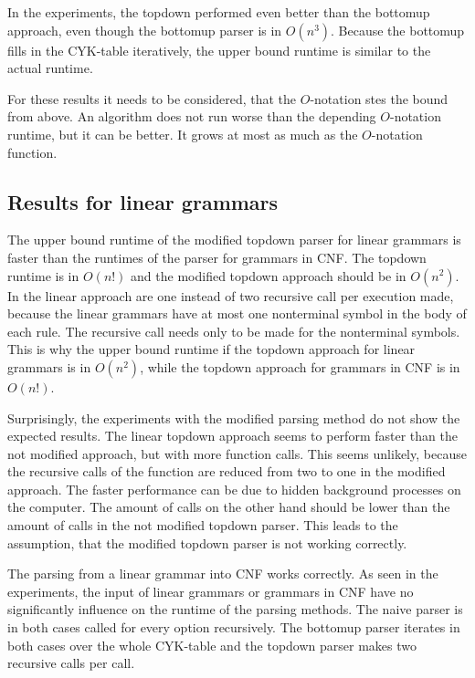 \documentclass[a4paper, 11pt]{article}
\begin{document}
In the experiments, the topdown performed even better than the bottomup approach, even though the bottomup parser is in $O(n^3)$. Because the bottomup fills in the CYK-table iteratively, the upper bound runtime is similar to the actual runtime.

For these results it needs to be considered, that the $O$-notation stes the bound from above. An algorithm does not run worse than the depending $O$-notation runtime, but it can be better. It grows at most as much as the $O$-notation function. \cite{bigO}

\subsection{Results for linear grammars}
\label{results_linear}

The upper bound runtime of the modified topdown parser for linear grammars is faster than the runtimes of the parser for grammars in CNF. The topdown runtime is in $O(n!)$ and the modified topdown approach should be in $O(n^2)$. In the linear approach are one instead of two recursive call per execution made, because the linear grammars have at most one nonterminal symbol in the body of each rule. The recursive call needs only to be made for the nonterminal symbols. 
This is why the upper bound runtime if the topdown approach for linear grammars is in $O(n^2)$, while the topdown approach for grammars in CNF is in $O(n!)$.


Surprisingly, the experiments with the modified parsing method do not show the expected results. The linear topdown approach seems to perform faster than the not modified approach, but with more function calls. This seems unlikely, because the recursive calls of the function are reduced from two to one in the modified approach. The faster performance can be due to hidden background processes on the computer. The amount of calls on the other hand should be lower than the amount of calls in the not modified topdown parser. This leads to the assumption, that the modified topdown parser is not working correctly.

The parsing from a linear grammar into CNF works correctly. As seen in the experiments, the input of linear grammars or grammars in CNF have no significantly influence on the runtime of the parsing methods. The naive parser is in both cases called for every option recursively. The bottomup parser iterates in both cases over the whole CYK-table and the topdown parser makes two recursive calls per call.  
\end{document}
